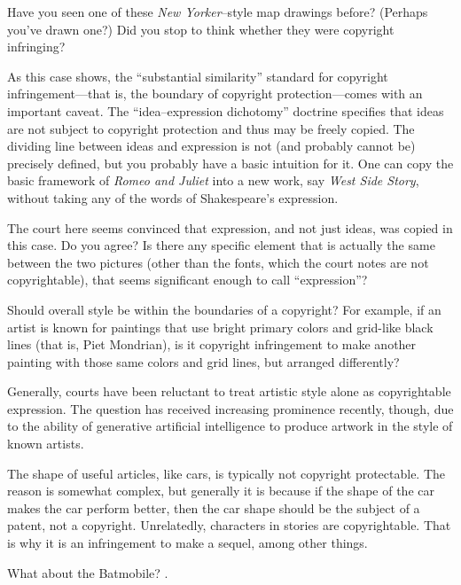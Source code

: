 
\item Have you seen one of these \emph{New Yorker}--style map drawings before?
(Perhaps you've drawn one?) Did you stop to think whether they were copyright
infringing?

\item As this case shows, the ``substantial similarity'' standard for copyright
infringement---that is, the boundary of copyright protection---comes with an
important caveat. The ``idea--expression dichotomy'' doctrine specifies that
ideas are not subject to copyright protection and thus may be freely copied. The
dividing line between ideas and expression is not (and probably cannot be)
precisely defined, but you probably have a basic intuition for it. One can copy
the basic framework of \emph{Romeo and Juliet} into a new work, say \emph{West
Side Story}, without taking any of the words of Shakespeare's expression.

The court here seems convinced that expression, and not just ideas, was copied
in this case. Do you agree? Is there any specific element that is actually the
same between the two pictures (other than the fonts, which the court notes are
not copyrightable), that seems significant enough to call ``expression''?

\item Should overall style be within the boundaries of a copyright? For example,
if an artist is known for paintings that use bright primary colors and grid-like
black lines (that is, Piet Mondrian), is it copyright infringement to make
another painting with those same colors and grid lines, but arranged
differently?

Generally, courts have been reluctant to treat artistic style alone as
copyrightable expression. The question has received increasing prominence
recently, though, due to the ability of generative artificial intelligence to
produce artwork in the style of known artists.

\item The shape of useful articles, like cars, is typically not copyright
protectable. The reason is somewhat complex, but generally it is because if the
shape of the car makes the car perform better, then the car shape should be the
subject of a patent, not a copyright. Unrelatedly, characters in stories are
copyrightable. That is why it is an infringement to make a sequel, among other
things.



What about the Batmobile? .

